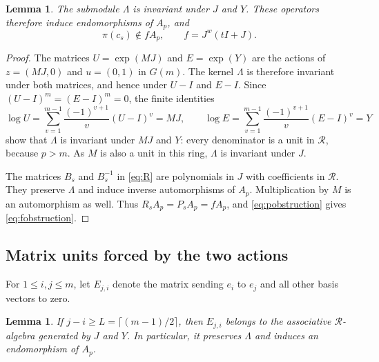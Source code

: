 \documentclass[11pt]{article}
\numberwithin{equation}{section}
\newtheorem{lemma}[theorem]{Lemma}
\theoremstyle{remark}
\begin{document}
\begin{lemma}\label{lem:descent}
The submodule $\Lambda$ is invariant under $J$ and $Y$. These
operators therefore induce endomorphisms of $A_p$, and
\begin{equation}\label{eq:fobstruction}
 \pi(c_s)\notin fA_p,\qquad f=J^w(tI+J).
\end{equation}
\end{lemma}

\begin{proof}
The matrices $U=\exp(MJ)$ and $E=\exp(Y)$ are the actions of
$z=(MJ,0)$ and $u=(0,1)$ in $G(m)$. The kernel $\Lambda$ is
therefore invariant under both matrices, and hence under $U-I$ and
$E-I$. Since $(U-I)^m=(E-I)^m=0$, the finite identities
\[
 \log U=\sum_{v=1}^{m-1}\frac{(-1)^{v+1}}v(U-I)^v=MJ,
 \qquad
 \log E=\sum_{v=1}^{m-1}\frac{(-1)^{v+1}}v(E-I)^v=Y
\]
show that $\Lambda$ is invariant under $MJ$ and $Y$: every
denominator is a unit in $\mathcal R$, because $p>m$.
As $M$ is also a unit in this ring, $\Lambda$ is invariant under $J$.

The matrices $B_s$ and $B_s^{-1}$ in \eqref{eq:R} are polynomials
in $J$ with coefficients in $\mathcal R$. They preserve $\Lambda$
and induce inverse automorphisms of $A_p$. Multiplication by $M$ is
an automorphism as well. Thus $R_sA_p=P_sA_p=fA_p$, and
\eqref{eq:pobstruction} gives \eqref{eq:fobstruction}.
\end{proof}

\subsection{Matrix units forced by the two actions}

For $1\le i,j\le m$, let $E_{j,i}$ denote the matrix sending $e_i$
to $e_j$ and all other basis vectors to zero.

\begin{lemma}\label{lem:matrixunits}
If $j-i\ge L=\lceil(m-1)/2\rceil$, then $E_{j,i}$ belongs to the
associative $\mathcal R$-algebra generated by $J$ and $Y$. In
particular, it preserves $\Lambda$ and induces an endomorphism of
$A_p$.
\end{lemma}
\end{document}

